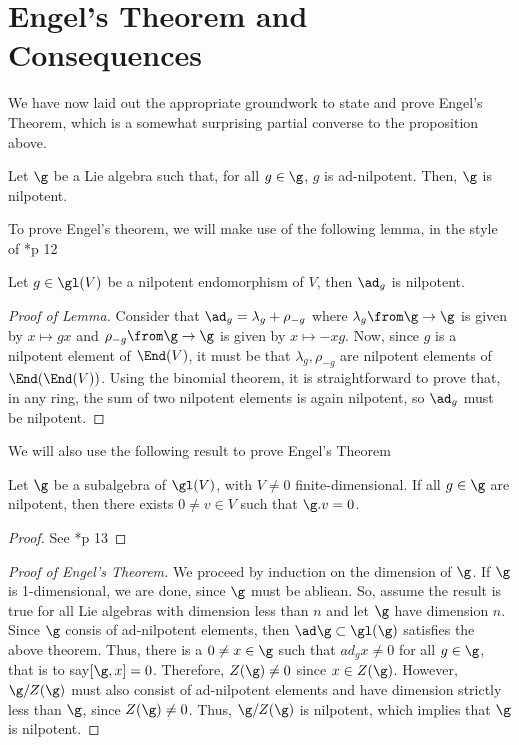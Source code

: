 \documentclass[11pt,leqno,oneside]{amsart}
\numberwithin{thm}{section}
\begin{document}
\section{Engel's Theorem and Consequences}
We have now laid out the appropriate groundwork to state and prove
Engel's Theorem, which is a somewhat surprising partial converse to
the proposition above.
\begin{thm}
  Let \(\g\) be a Lie algebra such that, for all \(g \in \g\), \(g\)
  is ad-nilpotent. Then, \(\g\) is nilpotent.
\end{thm}
To prove Engel's theorem, we will make use of the following lemma, in
the style of \cite{humph}*{p 12}
\begin{lem}\label{nilp-implies-ad-nilp}
  Let \(g \in \gl(V)\) be a nilpotent endomorphism of \(V\), then
  \(\ad_g\) is nilpotent.
\end{lem}
\begin{proof}[Proof of Lemma]
  Consider that \(\ad_g = \lambda_g + \rho_{-g}\) where \(\lambda_g \from
  \g \to \g\) is given by \(x \mapsto gx\) and \(\rho_{-g} \from \g
  \to \g\) is given by \(x \mapsto -xg\). Now, since \(g\) is a
  nilpotent element of \(\End(V)\), it must be that \(\lambda_g,
  \rho_{-g}\) are nilpotent elements of \(\End(\End(V))\). Using the
  binomial theorem, it is straightforward to prove that, in any ring,
  the sum of 
  two nilpotent elements is again nilpotent, so \(\ad_g\) must be nilpotent.
\end{proof}
We will also use the following result to prove Engel's Theorem
\begin{thm}\label{nilp-has-nontrivial-simult-0-eigenspace}
  Let \(\g\) be a subalgebra of \(\gl(V)\), with \(V \neq 0\)
  finite-dimensional. If all \(g \in \g\) are nilpotent, then there
  exists \(0 \neq v \in V\) such that \(\g.v = 0\). 
\end{thm}
\begin{proof}
  See \cite{humph}*{p 13}
\end{proof}
\begin{proof}[Proof of Engel's Theorem]
  We proceed by induction on the dimension of \(\g\). If \(\g\) is
  1-dimensional, we are done, since \(\g\) must be abliean. So, assume
  the result is true for all Lie algebras with dimension less than
  \(n\) and let \(\g\) have dimension \(n\). Since \(\g\) consis of
  ad-nilpotent elements, then \(\ad \g \subset 
  \gl(\g)\) satisfies the above theorem. Thus, there is a \(0 \neq x \in
  \g\) such that \(ad_g x \neq 0\) for all \(g \in \g\), that is to
  say\([\g, x] = 0\). Therefore, \(Z(\g) \neq 0\) since \(x \in
  Z(\g)\). However, \(\g / Z(\g)\) must also consist of ad-nilpotent
  elements and have dimension strictly less than \(\g\), since \(Z(\g)
  \neq 0\). Thus, \(\g / Z(\g)\) is nilpotent, which implies that
  \(\g\) is nilpotent. 
\end{proof}
\end{document}
